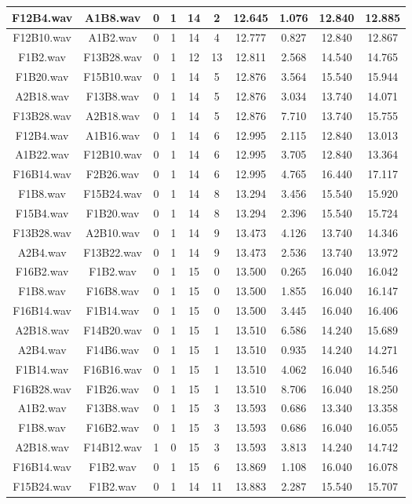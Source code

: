 \documentclass[11pt,a4paper,twoside]{book}
\begin{document}
\begin{longtable}[c]{|c|c|c|c|c|c|c|c|c|c|}
F12B4.wav&A1B8.wav&0&1&14&2&12.645&1.076&12.840&12.885\\ \hline
F12B10.wav&A1B2.wav&0&1&14&4&12.777&0.827&12.840&12.867\\ \hline
F1B2.wav&F13B28.wav&0&1&12&13&12.811&2.568&14.540&14.765\\ \hline
F1B20.wav&F15B10.wav&0&1&14&5&12.876&3.564&15.540&15.944\\ \hline
A2B18.wav&F13B8.wav&0&1&14&5&12.876&3.034&13.740&14.071\\ \hline
F13B28.wav&A2B18.wav&0&1&14&5&12.876&7.710&13.740&15.755\\ \hline
F12B4.wav&A1B16.wav&0&1&14&6&12.995&2.115&12.840&13.013\\ \hline
A1B22.wav&F12B10.wav&0&1&14&6&12.995&3.705&12.840&13.364\\ \hline
F16B14.wav&F2B26.wav&0&1&14&6&12.995&4.765&16.440&17.117\\ \hline
F1B8.wav&F15B24.wav&0&1&14&8&13.294&3.456&15.540&15.920\\ \hline
F15B4.wav&F1B20.wav&0&1&14&8&13.294&2.396&15.540&15.724\\ \hline
F13B28.wav&A2B10.wav&0&1&14&9&13.473&4.126&13.740&14.346\\ \hline
A2B4.wav&F13B22.wav&0&1&14&9&13.473&2.536&13.740&13.972\\ \hline
F16B2.wav&F1B2.wav&0&1&15&0&13.500&0.265&16.040&16.042\\ \hline
F1B8.wav&F16B8.wav&0&1&15&0&13.500&1.855&16.040&16.147\\ \hline
F16B14.wav&F1B14.wav&0&1&15&0&13.500&3.445&16.040&16.406\\ \hline
A2B18.wav&F14B20.wav&0&1&15&1&13.510&6.586&14.240&15.689\\ \hline
A2B4.wav&F14B6.wav&0&1&15&1&13.510&0.935&14.240&14.271\\ \hline
F1B14.wav&F16B16.wav&0&1&15&1&13.510&4.062&16.040&16.546\\ \hline
F16B28.wav&F1B26.wav&0&1&15&1&13.510&8.706&16.040&18.250\\ \hline
A1B2.wav&F13B8.wav&0&1&15&3&13.593&0.686&13.340&13.358\\ \hline
F1B8.wav&F16B2.wav&0&1&15&3&13.593&0.686&16.040&16.055\\ \hline
A2B18.wav&F14B12.wav&1&0&15&3&13.593&3.813&14.240&14.742\\ \hline
F16B14.wav&F1B2.wav&0&1&15&6&13.869&1.108&16.040&16.078\\ \hline
F15B24.wav&F1B2.wav&0&1&14&11&13.883&2.287&15.540&15.707\\ \hline

\end{longtable}
\end{document}
